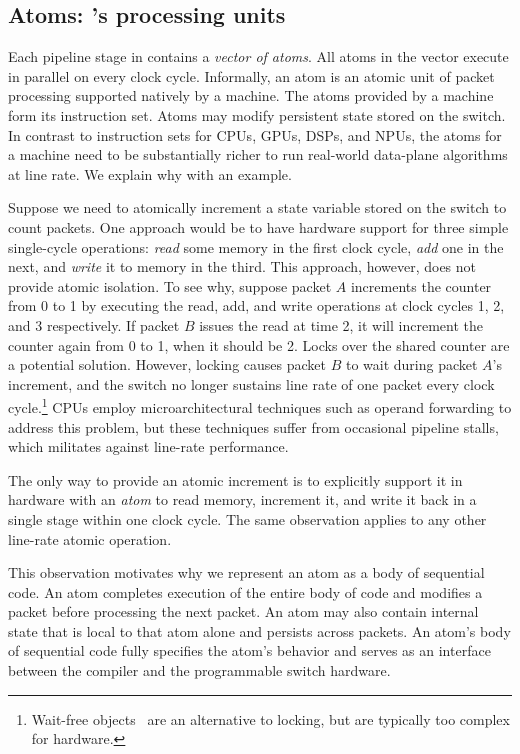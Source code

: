 \subsection{Atoms: \absmachine's processing units}
\label{ss:atoms}

Each pipeline stage in \absmachine contains a {\em vector of
  atoms}. All atoms in the vector execute in parallel on every clock
cycle.  Informally, an atom is an atomic unit of packet processing
supported natively by a \absmachine machine.
The atoms provided by 
a \absmachine machine form its instruction set.
Atoms may modify persistent state stored on the
switch. In contrast to instruction sets for CPUs, GPUs, DSPs, and
NPUs, the atoms for a \absmachine machine need to be substantially
richer to run real-world data-plane algorithms at line rate. We
explain why with an example.

Suppose we need to atomically increment a state variable stored on the switch
to count packets. One approach would be to have hardware support for three
simple single-cycle operations: \textit{read} some memory in the first clock
cycle, \textit{add} one in the next, and \textit{write} it to memory in the
third. This approach, however, does not provide atomic isolation. To see why,
suppose packet $A$ increments the counter from 0 to 1 by executing the read,
add, and write operations at clock cycles 1, 2, and 3 respectively.  If packet
$B$ issues the read at time 2, it will increment the counter again from 0 to 1,
when it should be 2. Locks over the shared counter are a potential
solution. However, locking causes packet $B$ to wait during packet $A$'s
increment, and the switch no longer sustains line rate of one packet every
clock cycle.\footnote{Wait-free objects~\cite{herlihy_wait} are an alternative
  to locking, but are typically too complex for hardware.} CPUs employ microarchitectural
  techniques such as operand forwarding to address this problem, but these techniques
  suffer from occasional pipeline stalls, which militates against line-rate
  performance.

The only way to provide an atomic increment is to explicitly support it in
hardware with an {\em atom} to read memory, increment it, and write it back in
a single stage within one clock cycle. The same observation applies to any
other line-rate atomic operation.

This observation motivates why we represent an atom as a body of sequential
code. An atom completes execution of the entire body of code and modifies a
packet before processing the next packet.  An atom may also contain internal
state that is local to that atom alone and persists across packets. An atom's
body of sequential code fully specifies the atom's behavior and serves as an
interface between the compiler and the programmable switch hardware.

